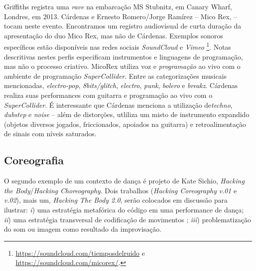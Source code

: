 Griffiths registra uma \emph{rave} na embarcação  MS Stubnitz, em Canary Wharf, Londres, em 2013. Cárdenas e Ernesto Romero/Jorge Ramírez -- Mico Rex,  -- tocam neste evento. Encontramos um registro audiovisual de curta duração da apresentação do duo Mico Rex, mas não de Cárdenas. Exemplos sonoros específicos estão disponíveis nas redes sociais \emph{SoundCloud} e \emph{Vimeo} \footnote{\url{https://soundcloud.com/tiemposdelruido} e \url{https://soundcloud.com/micorex/}.}. Notas descritivas nestes perfis especificam instrumentos e linguagens de programação, mas não o processo criativo. MicoRex utiliza voz e \emph{programação} ao vivo com o ambiente de programação \emph{SuperCollider}. Entre as categorizações musicais mencionadas, \emph{electro-pop}, \emph{8bits/glitch}, \emph{electro}, \emph{punk}, \emph{bolero} e \emph{breakz}. Cárdenas realiza suas performances com guitarra e programação ao vivo com o \emph{SuperCollider}. É interessante que Cárdenas menciona a utilização de\emph{techno}, \emph{dubstep} e \emph{noise} -- além de distorções, utliliza um misto de instrumento expandido (objetos diversos jogados, friccionados, apoiados na guitarra) e retroalimentação de sinais com níveis saturados.  

\subsection{Coreografia}\label{sec:coreografia}

O segundo exemplo de um contexto de dança é projeto de Kate Sichio, \emph{Hacking the Body}/\emph{Hacking Choreography}. Dois trabalhos (\emph{Hacking Coreography} \emph{v.01} e \emph{v.02}), mais um, \emph{Hacking The Body 2.0}, serão colocados em discussão para ilustrar: \emph{i}) uma estratégia metafórica do código em uma performance de dança; \emph{ii}) uma estratégia transversal  de codificação de movimentos ; \emph{iii}) problematização do som ou imagem como resultado da improvisação.

